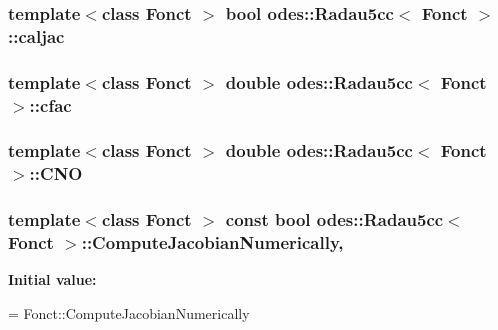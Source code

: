 \subsubsection[{caljac}]{\setlength{\rightskip}{0pt plus 5cm}template$<$class Fonct $>$ bool {\bf odes\+::\+Radau5cc}$<$ Fonct $>$\+::caljac\hspace{0.3cm}{\ttfamily [private]}}\label{classodes_1_1Radau5cc_a774b282697116ae2f25f6d2fdce9410c}
\hypertarget{classodes_1_1Radau5cc_afa383ebf8974ba3aac8841b6a4b43afa}{}
\subsubsection[{cfac}]{\setlength{\rightskip}{0pt plus 5cm}template$<$class Fonct $>$ double {\bf odes\+::\+Radau5cc}$<$ Fonct $>$\+::cfac\hspace{0.3cm}{\ttfamily [private]}}\label{classodes_1_1Radau5cc_afa383ebf8974ba3aac8841b6a4b43afa}
\hypertarget{classodes_1_1Radau5cc_aaa49f4e7f5289a7012e2ce29d2a7dab8}{}
\subsubsection[{C\+N\+O}]{\setlength{\rightskip}{0pt plus 5cm}template$<$class Fonct $>$ double {\bf odes\+::\+Radau5cc}$<$ Fonct $>$\+::C\+N\+O\hspace{0.3cm}{\ttfamily [private]}}\label{classodes_1_1Radau5cc_aaa49f4e7f5289a7012e2ce29d2a7dab8}
\hypertarget{classodes_1_1Radau5cc_a742c490578cf9e4dcf692e6706c2ec90}{}
\subsubsection[{Compute\+Jacobian\+Numerically}]{\setlength{\rightskip}{0pt plus 5cm}template$<$class Fonct $>$ const bool {\bf odes\+::\+Radau5cc}$<$ Fonct $>$\+::Compute\+Jacobian\+Numerically\hspace{0.3cm}{\ttfamily [static]}, {\ttfamily [private]}}\label{classodes_1_1Radau5cc_a742c490578cf9e4dcf692e6706c2ec90}
{\bfseries Initial value\+:}
\begin{DoxyCode}
=
      Fonct::ComputeJacobianNumerically
\end{DoxyCode}
\hypertarget{classodes_1_1Radau5cc_ae99cd8b33b1370b4b2dddb0361d6bb1e}{}
